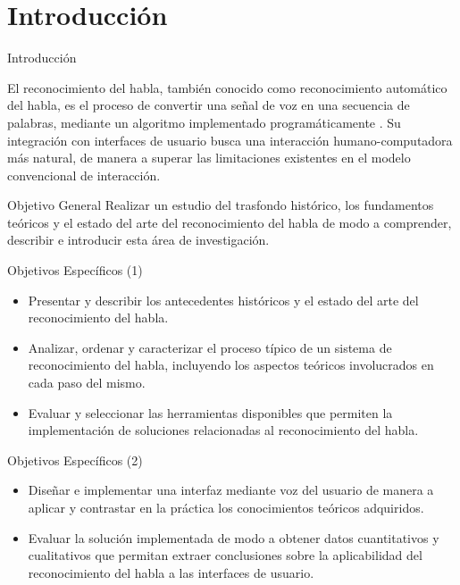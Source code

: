 \section{Introducci\'on}

\begin{frame}{Introducci\'on}

El reconocimiento del habla, tambi\'en conocido como reconocimiento autom\'atico del habla,
es el proceso de convertir una se\~nal de voz en una secuencia de
palabras, mediante un algoritmo implementado program\'aticamente \cite{JaisalAReview2012}. 
Su integraci\'on con interfaces de usuario busca una interacci\'on humano-computadora m\'as
natural, de manera a superar las limitaciones existentes en el modelo convencional
de interacci\'on.

\end{frame}

\begin{frame}{Objetivo General}
Realizar un estudio del trasfondo hist\'{o}rico, los fundamentos te\'{o}ricos 
y el estado del arte del reconocimiento del habla de modo a comprender, describir 
e introducir esta \'{a}rea de investigaci\'{o}n. 
\end{frame}

\begin{frame}{Objetivos Espec\'ificos (1)}

\begin{itemize}
    \item Presentar y describir los antecedentes hist\'oricos y el estado del arte del reconocimiento del habla.
    
    \item Analizar, ordenar y caracterizar el proceso t\'{i}pico de un sistema de reconocimiento del habla, 
        incluyendo los aspectos te\'{o}ricos involucrados en cada paso del mismo.

    \item Evaluar y seleccionar las herramientas disponibles que permiten la implementaci\'{o}n de soluciones 
        relacionadas al reconocimiento del habla.
\end{itemize}

\end{frame}

\begin{frame}{Objetivos Espec\'ificos (2)}

\begin{itemize}
    
    \item Dise\~{n}ar e implementar una interfaz mediante voz del usuario de manera a aplicar y 
    contrastar en la pr\'{a}ctica los conocimientos te\'{o}ricos adquiridos.
    
    \item Evaluar la soluci\'{o}n implementada de modo a obtener datos cuantitativos y cualitativos que 
        permitan extraer conclusiones sobre la aplicabilidad del reconocimiento del habla a las interfaces 
        de usuario.
\end{itemize}

\end{frame}
